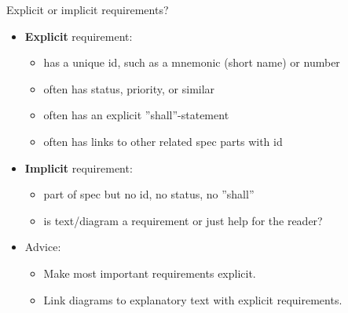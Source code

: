 \begin{Slide}{Explicit or implicit requirements?}

\begin{itemize}
\item \textbf{Explicit} requirement: 
\begin{itemize}
\item has a unique id, such as a mnemonic (short name) or number
\item often has status, priority, or similar 
\item often has an explicit ''shall''-statement
\item often has links to other related spec parts with id
\end{itemize}
\item \textbf{Implicit} requirement:
\begin{itemize}
\item part of spec but no id, no status, no ''shall'' 
\item is text/diagram a requirement or just help for the reader?
\end{itemize}
\item Advice: 
\begin{itemize}
\item Make most important requirements explicit.
\item Link diagrams to explanatory text with explicit requirements. 



\end{itemize}
\end{itemize}
\end{Slide}